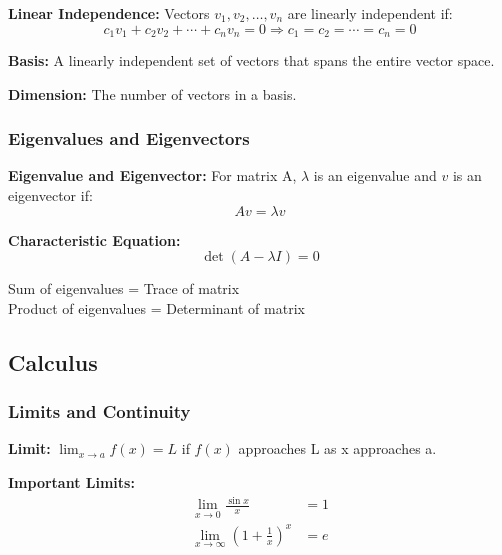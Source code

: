 \documentclass[11pt,a4paper]{article}
\begin{document}
\begin{defbox}
\textbf{Linear Independence:} Vectors $v_1, v_2, \ldots, v_n$ are linearly independent if:
\[
    c_1v_1 + c_2v_2 + \cdots + c_nv_n = 0 \Rightarrow c_1 = c_2 = \cdots = c_n = 0
\]
\end{defbox}

\begin{defbox}
\textbf{Basis:} A linearly independent set of vectors that spans the entire vector space.
\end{defbox}

\begin{defbox}
\textbf{Dimension:} The number of vectors in a basis.
\end{defbox}

\subsubsection{Eigenvalues and Eigenvectors}

\begin{defbox}
\textbf{Eigenvalue and Eigenvector:} For matrix A, $\lambda$ is an eigenvalue and $v$ is an eigenvector if:
\[
    Av = \lambda v
\]
\end{defbox}

\textbf{Characteristic Equation:}
\[
    \det(A - \lambda I) = 0
\]

\begin{notebox}
Sum of eigenvalues = Trace of matrix\\
Product of eigenvalues = Determinant of matrix
\end{notebox}

\subsection{Calculus}

\subsubsection{Limits and Continuity}

\begin{defbox}
\textbf{Limit:} $\lim_{x \to a} f(x) = L$ if $f(x)$ approaches L as x approaches a.
\end{defbox}

\textbf{Important Limits:}
\begin{align*}
    \lim_{x \to 0} \frac{\sin x}{x} &= 1 \\
    \lim_{x \to \infty} \left(1 + \frac{1}{x}\right)^x &= e
\end{align*}
\end{document}
